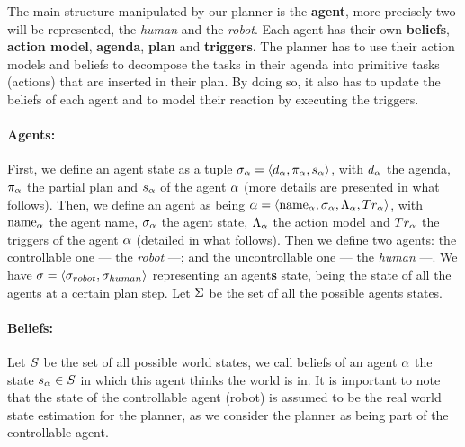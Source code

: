 \documentclass[a4paper,11pt,twoside]{StyleThese}
\begin{document}
The main structure manipulated by our planner is the \textbf{agent}, more precisely two will be represented, the \textit{human} and the \textit{robot}. Each agent has their own \textbf{beliefs}, \textbf{action model}, \textbf{agenda}, \textbf{plan} and \textbf{triggers}. The planner has to use their action models and beliefs to decompose the tasks in their agenda into primitive tasks (actions) that are inserted in their plan. By doing so, it also has to update the beliefs of each agent and to model their reaction by executing the triggers.

\paragraph{\bf Agents:}
First, we define an agent state as a tuple $\sigma_{\alpha} = \langle  d_{\alpha}, \pi_{\alpha}, s_{\alpha} \rangle$, with $d_{\alpha}$ the agenda, $\pi_{\alpha}$ the partial plan and $s_{\alpha}$ of the agent $\alpha$ (more details are presented in what follows). Then, we define an agent as being $\alpha = \langle \text{name}_{\alpha}, \sigma_{\alpha}, \Lambda_{\alpha}, Tr_{\alpha} \rangle$, with $\text{name}_{\alpha}$ the agent name, $\sigma_{\alpha}$ the agent state, $\Lambda_{\alpha}$ the action model and $Tr_{\alpha}$ the triggers of the agent $\alpha$ (detailed in what follows). Then we define two agents: the controllable one --- the \textit{robot} ---; and the uncontrollable one --- the \textit{human} ---. We have $\sigma = \langle \sigma_{robot}, \sigma_{human} \rangle$ representing an agent\textbf{s} state, being the state of all the agents at a certain plan step. Let $\Sigma$ be the set of all the possible agents states.

\paragraph{\bf Beliefs:}
Let $S$ be the set of all possible world states, we call beliefs of an agent $\alpha$ the state $s_{\alpha} \in S$ in which this agent thinks the world is in. It is important to note that the state of the controllable agent (robot) is assumed to be the real world state estimation for the planner, as we consider the planner as being part of the controllable agent.
\end{document}
